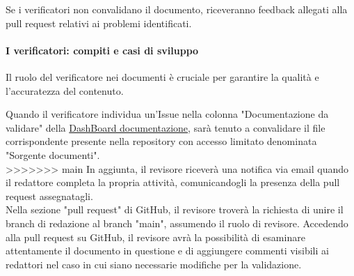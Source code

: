 \documentclass{article}
\begin{document}
   Se i verificatori non convalidano il documento, riceveranno feedback allegati alla pull request relativi ai problemi identificati.

    \paragraph{I verificatori: compiti e casi di sviluppo}\label{sec:verificatori}

    Il ruolo del verificatore nei documenti è cruciale per garantire la qualità e l'accuratezza del contenuto.

Quando il verificatore individua un'Issue nella colonna "Documentazione da validare" della  \href{https://github.com/orgs/ByteOps-swe/projects/1/views/1}{DashBoard documentazione}, sarà tenuto a convalidare il file corrispondente presente nella repository con accesso limitato denominata "Sorgente documenti". \\
>>>>>>> main
In aggiunta, il revisore riceverà una notifica via email quando il redattore completa la propria attività, comunicandogli la presenza della pull request assegnatagli.\\
Nella sezione "pull request" di GitHub, il revisore troverà la richiesta di unire il branch di redazione al branch "main", assumendo il ruolo di revisore. Accedendo alla pull request su GitHub, il revisore avrà la possibilità di esaminare attentamente il documento in questione e di aggiungere commenti visibili ai redattori nel caso in cui siano necessarie modifiche per la validazione.

\vspace{0.3cm}
\end{document}
